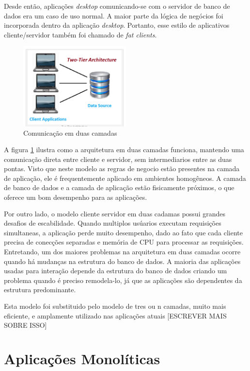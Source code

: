Desde então, aplicações \textit{desktop} comunicando-se com o servidor de banco de dados era um caso de uso normal. A maior parte da lógica de negócios foi incorporada dentro da aplicação \textit{desktop}. Portanto, esse estilo de aplicativos cliente/servidor também foi chamado de \textit{fat clients}. 

\begin{figure}[ht]
    \centering
    \includegraphics[width=0.5\textwidth]{figuras/two-tier.png}
    \caption{Comunicação em duas camadas}
    \label{fig:two-tier}
\end{figure}

A figura \ref{fig:two-tier} ilustra como a arquitetura em duas camadas funciona, mantendo uma comunicação direta entre cliente e servidor, sem intermediarios entre as duas pontas. Visto que neste modelo as regras de negocio estão presentes na camada de aplicação, ele é frequentemente aplicado em ambientes homogêneos. A camada de banco de dados e a camada de aplicação estão fisicamente próximos, o que oferece um bom desempenho para as aplicações.

Por outro lado, o modelo cliente servidor em duas cadamas possui grandes desafios de escabilidade. Quando multiplos usúarios executam requisições simultaneas, a aplicação perde muito desempenho, dado ao fato que cada cliente precisa de conecções separadas e memória de CPU para processar as requisições. Entretando, um dos maiores problemas na arquitetura em duas camadas ocorre quando há mudanças na estrutura do banco de dados. A maioria das aplicações usadas para interação depende da estrutura do banco de dados criando um problema quando é preciso remodela-lo, já que as aplicações são dependentes da estrutura predominante.

Esta modelo foi substituido pelo modelo de tres ou n camadas, muito mais eficiente, e amplamente utilizado nas aplicações atuais [ESCREVER MAIS SOBRE ISSO]

\section{Aplicações Monolíticas}\label{sec:monolitico}

